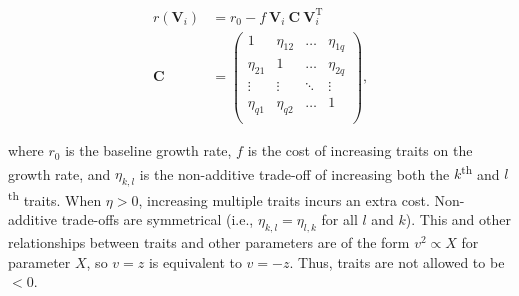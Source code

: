 \begin{equation} \label{eq:growth-rate}
\begin{split}
    r(\mathbf{V}_i) &= r_0 - f ~ \mathbf{V}_i ~ \mathbf{C} ~ \mathbf{V}_{i}^{\textrm{T}} \\
    \mathbf{C} &= \begin{pmatrix}
        1      & \eta_{12} & \ldots & \eta_{1q} \\
        \eta_{21} & 1      & \ldots & \eta_{2q} \\
        \vdots & \vdots & \ddots & \vdots \\
        \eta_{q1} & \eta_{q2} & \ldots & 1      \\
        \end{pmatrix}
    \textrm{,}
\end{split}
\end{equation}

\noindent where $r_0$ is the baseline growth rate,
$f$ is the cost of increasing traits on the growth rate, and
$\eta_{k,l}$ is the non-additive trade-off of increasing both the
$k$\textsuperscript{th} and $l$\textsuperscript{th} traits.
When $\eta > 0$, increasing multiple traits incurs an extra cost.
Non-additive trade-offs are symmetrical (i.e., $\eta_{k,l} = \eta_{l,k}$ for all
$l$ and $k$).
This and other relationships between traits and other parameters are of the form
$v^2 \propto X$ for parameter $X$, so $v = z$ is equivalent to $v = -z$.
Thus, traits are not allowed to be $< 0$.


%
%


